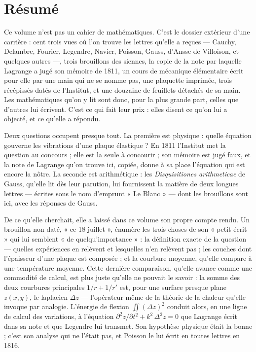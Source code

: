 \documentclass[11pt,a4paper]{article}
\begin{document}
\section*{Résumé}

\begin{resume}
Ce volume n'est pas un cahier de mathématiques. C'est le dossier extérieur
d'une carrière : cent trois vues où l'on trouve les lettres qu'elle a reçues —
Cauchy, Delambre, Fourier, Legendre, Navier, Poisson, Gauss, d'Ansse de
Villoison, et quelques autres —, trois brouillons des siennes, la copie de la
note par laquelle Lagrange a jugé son mémoire de 1811, un cours de mécanique
élémentaire écrit pour elle par une main qui ne se nomme pas, une plaquette
imprimée, trois récépissés datés de l'Institut, et une douzaine de feuillets
détachés de sa main. Les mathématiques qu'on y lit sont donc, pour la plus
grande part, celles que d'autres lui écrivent. C'est ce qui fait leur prix :
elles disent ce qu'on lui a objecté, et ce qu'elle a répondu.

Deux questions occupent presque tout. La première est physique : quelle
équation gouverne les vibrations d'une plaque élastique ? En 1811 l'Institut
met la question au concours ; elle est la seule à concourir ; son mémoire est
jugé faux, et la note de Lagrange qu'on trouve ici, copiée, donne à sa place
l'équation qui est encore la nôtre. La seconde est arithmétique : les
\emph{Disquisitiones arithmeticae} de Gauss, qu'elle lit dès leur parution,
lui fournissent la matière de deux longues lettres — écrites sous le nom
d'emprunt « Le Blanc » — dont les brouillons sont ici, avec les réponses de
Gauss.

De ce qu'elle cherchait, elle a laissé dans ce volume son propre compte rendu.
Un brouillon non daté, « ce 18 juillet », énumère les trois choses de son
« petit écrit » qui lui semblent « de quelqu'importance » : la définition
exacte de la question — quelles expériences en relèvent et lesquelles n'en
relèvent pas ; les couches dont l'épaisseur d'une plaque est composée ; et la
courbure moyenne, qu'elle compare à une température moyenne. Cette dernière
comparaison, qu'elle avance comme une commodité de calcul, est plus juste
qu'elle ne pouvait le savoir : la somme des deux courbures principales
$1/r + 1/r'$ est, pour une surface presque plane $z(x,y)$, le laplacien
$\Delta z$ — l'opérateur même de la théorie de la chaleur qu'elle invoque par
analogie. L'énergie de flexion $\iint (\Delta z)^2$ conduit alors, en une
ligne de calcul des variations, à l'équation
$\partial^2 z/\partial t^2 + k^2\,\Delta^2 z = 0$ que Lagrange écrit dans sa
note et que Legendre lui transmet. Son hypothèse physique était la bonne ;
c'est son analyse qui ne l'était pas, et Poisson le lui écrit en toutes
lettres en 1816.


\end{resume}
\end{document}
